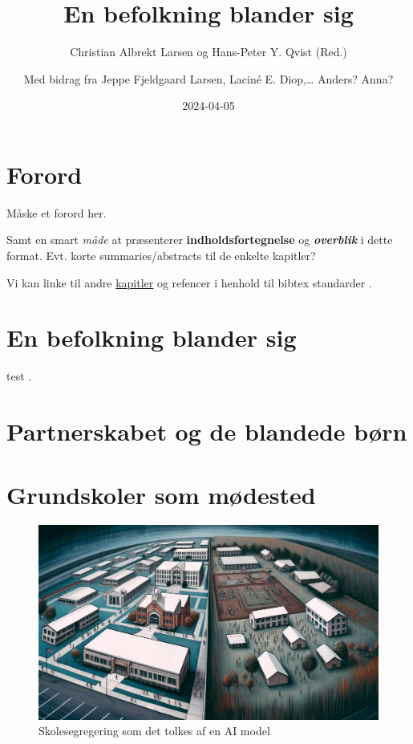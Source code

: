 \documentclass[
]{book}
\title{En befolkning blander sig}
\author{Christian Albrekt Larsen og Hans-Peter Y. Qvist (Red.) \and Med bidrag fra Jeppe Fjeldgaard Larsen, Laciné E. Diop,\ldots{} Anders? Anna?}
\date{2024-04-05}
\begin{document}
\maketitle

{
\setcounter{tocdepth}{1}
\tableofcontents
}
\hypertarget{forord}{%
\chapter*{Forord}\label{forord}}

Måske et forord her.

Samt en smart \emph{måde} at præsenterer \textbf{indholdsfortegnelse} og \textbf{\emph{overblik}} i dette format. Evt. korte summaries/abstracts til de enkelte kapitler?

Vi kan linke til andre \protect\hyperlink{kap1}{kapitler} og refencer i henhold til bibtex standarder \citep{xie2015}.

\hypertarget{kap1}{%
\chapter{En befolkning blander sig}\label{kap1}}

test \citep{xie2015}.

\hypertarget{kap2}{%
\chapter{Partnerskabet og de blandede børn}\label{kap2}}

\hypertarget{kap3}{%
\chapter{Grundskoler som mødested}\label{kap3}}

\begin{figure}
\includegraphics[width=24.89in]{images/dalle-schoolseg} \caption{Skolesegregering som det tolkes af en AI model}\label{fig:fig-schoolseg}
\end{figure}
\end{document}
